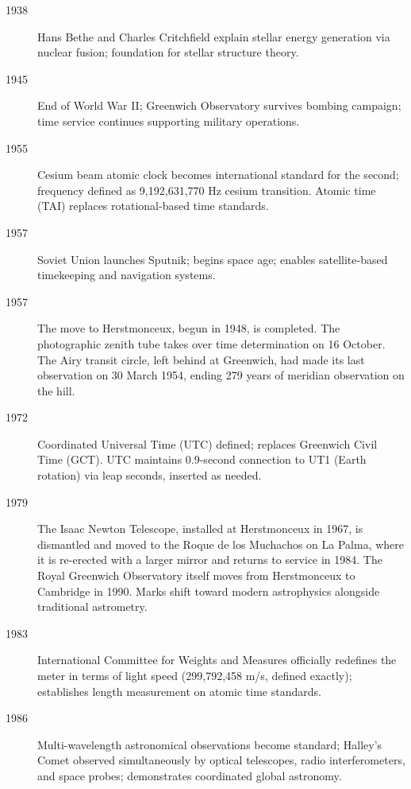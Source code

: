 \begin{description}
\item[1938] Hans Bethe and Charles Critchfield explain stellar energy generation via nuclear fusion; foundation for stellar structure theory.

\item[1945] End of World War II; Greenwich Observatory survives bombing campaign; time service continues supporting military operations.

\item[1955] Cesium beam atomic clock becomes international standard for the second; frequency defined as 9,192,631,770 Hz cesium transition. Atomic time (TAI) replaces rotational-based time standards.

\item[1957] Soviet Union launches Sputnik; begins space age; enables satellite-based timekeeping and navigation systems.

\item[1957] The move to Herstmonceux, begun in 1948, is completed. The photographic zenith tube takes over time determination on 16 October. The Airy transit circle, left behind at Greenwich, had made its last observation on 30 March 1954, ending 279 years of meridian observation on the hill.

\item[1972] Coordinated Universal Time (UTC) defined; replaces Greenwich Civil Time (GCT). UTC maintains 0.9-second connection to UT1 (Earth rotation) via leap seconds, inserted as needed.

\item[1979] The Isaac Newton Telescope, installed at Herstmonceux in 1967, is dismantled and moved to the Roque de los Muchachos on La Palma, where it is re-erected with a larger mirror and returns to service in 1984. The Royal Greenwich Observatory itself moves from Herstmonceux to Cambridge in 1990. Marks shift toward modern astrophysics alongside traditional astrometry.

\item[1983] International Committee for Weights and Measures officially redefines the meter in terms of light speed (299,792,458 m/s, defined exactly); establishes length measurement on atomic time standards.

\item[1986] Multi-wavelength astronomical observations become standard; Halley's Comet observed simultaneously by optical telescopes, radio interferometers, and space probes; demonstrates coordinated global astronomy.


\end{description}
